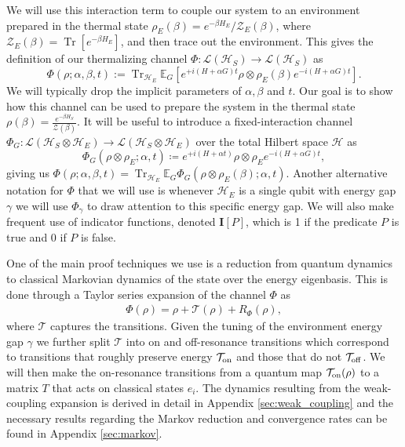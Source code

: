 \documentclass[
 amsmath,amssymb,
 aps,
onecolumn, 
nofootinbib]{revtex4-2}
\newcommand{\on}{\rm on}
\newcommand{\off}{\rm off}
\newcommand{\brackets}[1]{\left[ #1 \right]}
\DeclareMathOperator{\Tr}{Tr}
\newcommand{\trace}[1]{\Tr \brackets{ #1 }}
\newcommand{\hilb}{\mathcal{H}}
\newcommand{\partfun}{\mathcal{Z}}
\begin{document}
We will use this interaction term to couple our system to an environment prepared in the thermal state $\rho_E(\beta) = e^{-\beta H_E} /\partfun_E(\beta)$, where $\partfun_E(\beta) = \trace{e^{-\beta H_E}}$, and then trace out the environment. This gives the definition of our thermalizing channel $\Phi : \mathcal{L}(\hilb_S) \to \mathcal{L}(\hilb_S)$ as
\begin{equation}\label{eq:PhiDef}
    \Phi(\rho ; \alpha, \beta, t) :=  \Tr_{\hilb_E} \mathbb{E}_{G} \left[ e^{+i(H + \alpha G)t} \rho \otimes \rho_E(\beta) e^{-i(H + \alpha G) t}\right]. 
\end{equation}
We will typically drop the implicit parameters of $\alpha, \beta$ and $t$. Our goal is to show how this channel can be used to prepare the system in the thermal state $\rho(\beta) = \frac{e^{-\beta H_S}}{\partfun(\beta)}$. It will be useful to introduce a fixed-interaction channel $\Phi_G : \mathcal{L}(\hilb_S \otimes \hilb_E) \to \mathcal{L}(\hilb_S \otimes \hilb_E)$ over the total Hilbert space $\hilb$ as 
\begin{equation}
    \Phi_G(\rho \otimes \rho_E; \alpha, t) \coloneqq e^{+i(H + \alpha t)} \rho \otimes \rho_E e^{- i(H + \alpha G)t}, \label{eq:phi_g_definition}
\end{equation}
giving us $\Phi(\rho; \alpha, \beta, t) = \Tr_{\hilb_E} \mathbb{E}_G \Phi_G(\rho \otimes \rho_E(\beta); \alpha, t)$. Another alternative notation for $\Phi$ that we will use is whenever $\hilb_E$ is a single qubit with energy gap $\gamma$ we will use $\Phi_\gamma$ to draw attention to this specific energy gap. We will also make frequent use of indicator functions, denoted $\mathbf{I}[P]$, which is 1 if the predicate $P$ is true and 0 if $P$ is false.

One of the main proof techniques we use is a reduction from quantum dynamics to classical Markovian dynamics of the state over the energy eigenbasis. This is done through a Taylor series expansion of the channel $\Phi$ as 
\begin{align}
    \Phi(\rho) = \rho + \mathcal{T}(\rho) + R_\Phi (\rho),
\end{align}
where $\mathcal{T}$ captures the transitions. Given the tuning of the environment energy gap $\gamma$ we further split $\mathcal{T}$ into on and off-resonance transitions which correspond to transitions that roughly preserve energy $\mathcal{T}_{\on}$ and those that do not $\mathcal{T}_{\off}$. We will then make the on-resonance transitions from a quantum map $\mathcal{T}_{\on} (\rho)$ to a matrix $T$ that acts on classical states $e_i$. The dynamics resulting from the weak-coupling expansion is derived in detail in Appendix \ref{sec:weak_coupling} and the necessary results regarding the Markov reduction and convergence rates can be found in Appendix \ref{sec:markov}.
\end{document}
